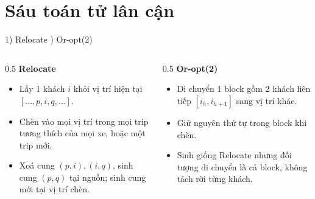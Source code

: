 \documentclass[aspectratio=169]{beamer}
\begin{document}
\section{Sáu toán tử lân cận}

\begin{frame}{1) Relocate ) Or-opt(2)}
  \begin{columns}[T]
    \begin{column}{0.5\textwidth}
      \textbf{Relocate}
      \begin{itemize}
        \item \small Lấy 1 khách $i$ khỏi vị trí hiện tại $[\ldots,p,i,q,\ldots]$.
        \item \small Chèn vào mọi vị trí trong mọi trip tương thích của mọi xe, hoặc một trip mới.
        \item \small Xoá cung $(p,i),(i,q)$, sinh cung $(p,q)$ tại nguồn; sinh cung mới tại vị trí chèn.
      \end{itemize}
    \end{column}
    \begin{column}{0.5\textwidth}
      \textbf{Or-opt(2)}
      \begin{itemize}
        \item \small Di chuyển 1 block gồm 2 khách liên tiếp $[i_h, i_{h+1}]$ sang vị trí khác.
        \item \small Giữ nguyên thứ tự trong block khi chèn.
        \item \small Sinh giống Relocate nhưng đối tượng di chuyển là cả block, không tách rời từng khách.
      \end{itemize}
    \end{column}
  \end{columns}
\end{frame}
\end{document}
